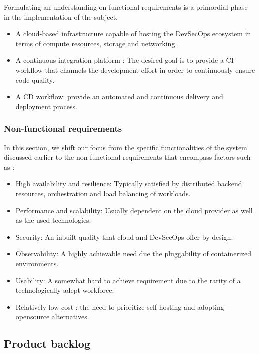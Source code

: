 \hspace{7mm}Formulating an understanding on functional requirements is a primordial phase in the implementation of the subject.

\begin{itemize}[label={--}]
\item A cloud-based infrastructure capable of hosting the DevSecOps ecosystem in terms of compute resources, storage and networking.
\item A continuous integration platform : The desired goal is to provide a CI workflow that channels the development effort in order to continuously ensure code quality.
\item A CD workflow: provide an automated and continuous delivery and deployment process.
\end{itemize}

\subsubsection{Non-functional requirements}

\hspace{7mm}In this section, we shift our focus from the specific functionalities of the system discussed earlier to the non-functional requirements that encompass factors such as :

\begin{itemize}[label={--}]
\item High availability and resilience: Typically satisfied by distributed backend resources, orchestration and load balancing of workloads. 
\item Performance and scalability: Usually dependent on the cloud provider as well as the used technologies.
\item Security: An inbuilt quality that cloud and DevSecOps offer by design.
\item Observability: A highly achievable need due the pluggability of containerized environments.
\item Usability: A somewhat hard to achieve requirement due to the rarity of a technologically adept workforce. 
\item Relatively low cost : the need to prioritize self-hosting and adopting opensource alternatives.
\end{itemize}

\newpage
\subsection{Product backlog }

